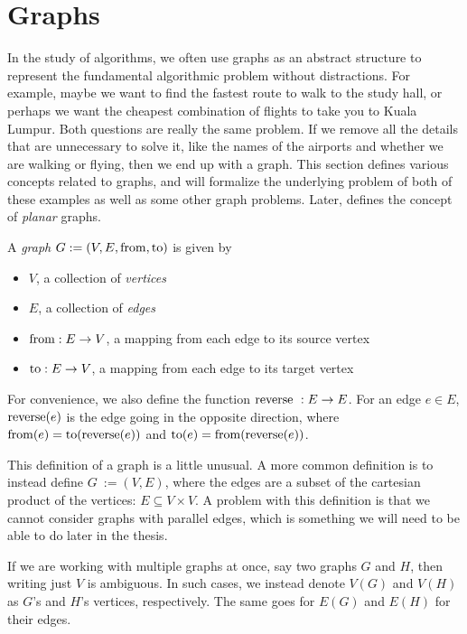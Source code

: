 \section{Graphs}
\label{section:graphs}
In the study of algorithms, we often use graphs as an abstract structure to represent the fundamental algorithmic problem without distractions. For example, maybe we want to find the fastest route to walk to the study hall, or perhaps we want the cheapest combination of flights to take you to Kuala Lumpur. Both questions are really the same problem. If we remove all the details that are unnecessary to solve it, like the names of the airports and whether we are walking or flying, then we end up with a graph. This section defines various concepts related to graphs, and  will formalize the underlying problem of both of these examples as well as some other graph problems. Later,  defines the concept of \emph{planar} graphs.

\begin{definition}[Graph]
    A \emph{graph} $G := (V, E, \operatorname{from}, \operatorname{to})$ is given by
\begin{itemize}
    \item $V$, a collection of \emph{vertices}
    \item $E$, a collection of \emph{edges}
    \item $\operatorname{from} : E \rightarrow V$, a mapping from each edge to its source vertex
    \item $\operatorname{to} : E \rightarrow V$, a mapping from each edge to its target vertex 
\end{itemize}
\end{definition}

For convenience, we also define the function $\operatorname{reverse}~: E \rightarrow E$. For an edge $e \in E$, $\operatorname{reverse}(e)$ is the edge going in the opposite direction, where $\operatorname{from}(e) = \operatorname{to}(\operatorname{reverse}(e))$ and $\operatorname{to}(e) = \operatorname{from}(\operatorname{reverse}(e))$.

This definition of a graph is a little unusual. A more common definition is to instead define $G~:= (V, E)$, where the edges are a subset of the cartesian product of the vertices: $E \subseteq V \times V$. A problem with this definition is that we cannot consider graphs with parallel edges, which is something we will need to be able to do later in the thesis.

If we are working with multiple graphs at once, say two graphs $G$ and $H$, then writing just $V$ is ambiguous. In such cases, we instead denote $V(G)$ and $V(H)$ as $G$'s and $H$'s vertices, respectively. The same goes for $E(G)$ and $E(H)$ for their edges.

